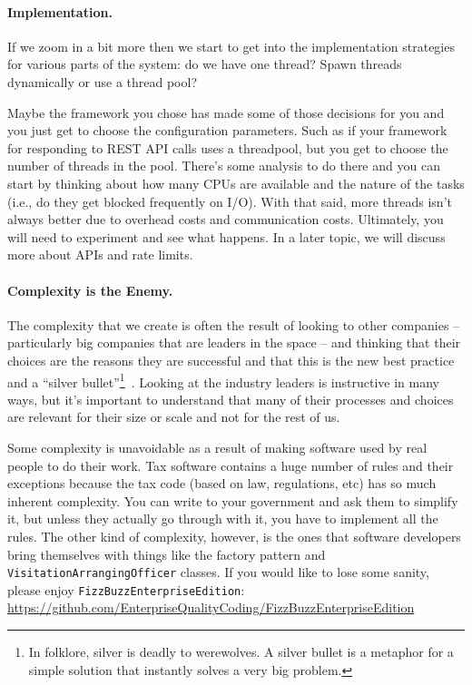 \paragraph{Implementation.} If we zoom in a bit more then we start to get into the implementation strategies for various parts of the system: do we have one thread? Spawn threads dynamically or use a thread pool? 

Maybe the framework you chose has made some of those decisions for you and you just get to choose the configuration parameters. Such as if your framework for responding to REST API calls uses a threadpool, but you get to choose the number of threads in the pool. There's some analysis to do there and you can start by thinking about how many CPUs are available and the nature of the tasks (i.e., do they get blocked frequently on I/O). With that said, more threads isn't always better due to overhead costs and communication costs. Ultimately, you will need to experiment and see what happens. In a later topic, we will discuss more about APIs and rate limits.


\paragraph{Complexity is the Enemy.}

The complexity that we create is often the result of looking to other companies -- particularly big companies that are leaders in the space -- and thinking that their choices are the reasons they are successful and that this is the new best practice and a ``silver bullet''\footnote{In folklore, silver is deadly to werewolves. A silver bullet is a metaphor for a simple solution that instantly solves a very big problem.}~\cite{architecture}. Looking at the industry leaders is instructive in many ways, but it's important to understand that many of their processes and choices are relevant for their size or scale and not for the rest of us. 

Some complexity is unavoidable as a result of making software used by real people to do their work. Tax software contains a huge number of rules and their exceptions because the tax code (based on law, regulations, etc) has so much inherent complexity. You can write to your government and ask them to simplify it, but unless they actually go through with it, you have to implement all the rules. The other kind of complexity, however, is the ones that software developers bring themselves with things like the factory pattern and \texttt{VisitationArrangingOfficer} classes. If you would like to lose some sanity, please enjoy \texttt{FizzBuzzEnterpriseEdition}: \url{https://github.com/EnterpriseQualityCoding/FizzBuzzEnterpriseEdition}
 
